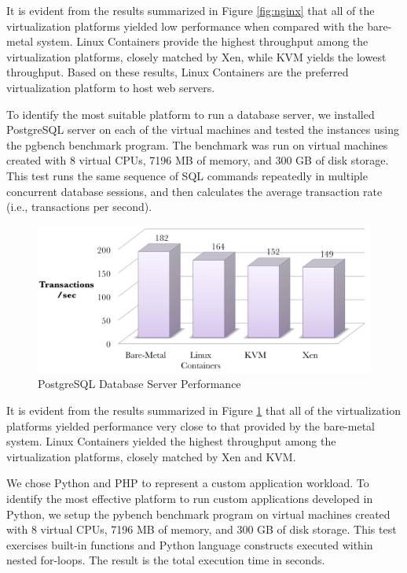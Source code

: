 It is evident from the results summarized in Figure \ref{fig:nginx} that all of the virtualization platforms yielded low performance when compared with the bare-metal system. Linux Containers provide the highest throughput among the virtualization platforms, closely matched by Xen, while KVM yields the lowest throughput. Based on these results, Linux Containers are the preferred virtualization platform to host web servers. 


To identify the most suitable platform to run a database server, we installed PostgreSQL server on each of the virtual machines and tested the instances using the pgbench benchmark program. The benchmark was run on virtual machines created with 8 virtual CPUs, 7196 MB of memory, and 300 GB of disk storage. This test runs the same sequence of SQL commands repeatedly in multiple concurrent database sessions, and then calculates the average transaction rate (i.e., transactions per second).

\begin{figure}[H]
\centering
\includegraphics[width=150mm]{pgbench.png}
\caption{PostgreSQL Database Server Performance}
\label{fig:pgbench}
\end{figure}

It is evident from the results summarized in Figure \ref{fig:pgbench} that all of the virtualization platforms yielded performance very close to that provided by the bare-metal system. Linux Containers yielded the highest throughput among the virtualization platforms, closely matched by Xen and KVM. 


We chose Python and PHP to represent a custom application workload. To identify the most effective platform to run custom applications developed in Python, we setup the pybench benchmark program on virtual machines created with 8 virtual CPUs, 7196 MB of memory, and 300 GB of disk storage. This test exercises built-in functions and Python language constructs executed within nested for-loops. The result is the total execution time in seconds.

